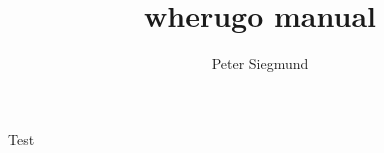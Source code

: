 \documentclass[10pt,a4paper,draft,twoside,titlepage]{report}
\author{Peter Siegmund}
\title{wherugo manual}
\begin{document}
Test
\end{document}
